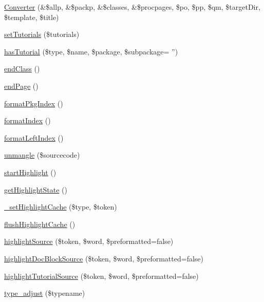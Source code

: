 \begin{DoxyCompactItemize}
\item 
\hyperlink{class_converter_a86b46c9ea23d7b44c9628a37bec7e7db}{\-Converter} (\&\$allp, \&\$packp, \&\$classes, \&\$procpages, \$po, \$pp, \$qm, \$target\-Dir, \$template, \$title)
\item 
\hyperlink{class_converter_a52727c72c50673a870a912015f2ee96f}{set\-Tutorials} (\$tutorials)
\item 
\hyperlink{class_converter_a15f1ec0bd54c234732a557e8ed2a200e}{has\-Tutorial} (\$type, \$name, \$package, \$subpackage= '')
\item 
\hyperlink{class_converter_ae4962a5674fd1be0f3795cb72f2974bf}{end\-Class} ()
\item 
\hyperlink{class_converter_a7e7c9e2e7d88f78fa6f8bf8776c443e5}{end\-Page} ()
\item 
\hyperlink{class_converter_a37200c9f589ee4eaeed637c5ce1af356}{format\-Pkg\-Index} ()
\item 
\hyperlink{class_converter_a963f73984fad30cb1776cd293eeb7db7}{format\-Index} ()
\item 
\hyperlink{class_converter_a39bb30299ec5d6ba31096e51f2bcc4b4}{format\-Left\-Index} ()
\item 
\hyperlink{class_converter_ab36840588a8c62493031b9f23c4918c5}{unmangle} (\$sourcecode)
\item 
\hyperlink{class_converter_a4857ad525ae19eef047cd7a7a5e59550}{start\-Highlight} ()
\item 
\hyperlink{class_converter_a60de94fc1b76b4194d6efa2e859aac81}{get\-Highlight\-State} ()
\item 
\hyperlink{class_converter_a07f79cef0df4253f3e109ec7cc306c59}{\-\_\-set\-Highlight\-Cache} (\$type, \$token)
\item 
\hyperlink{class_converter_a9c2e1a8cb6871fafd9ab49135e594063}{flush\-Highlight\-Cache} ()
\item 
\hyperlink{class_converter_ac9a9409bcaedc45c69c0919344f7cc05}{highlight\-Source} (\$token, \$word, \$preformatted=false)
\item 
\hyperlink{class_converter_ae15249c21c99541ebff27f78c7ed7a62}{highlight\-Doc\-Block\-Source} (\$token, \$word, \$preformatted=false)
\item 
\hyperlink{class_converter_ae0a44b2e15f9fc8fc0d357e7dd39a9a2}{highlight\-Tutorial\-Source} (\$token, \$word, \$preformatted=false)
\item 
\hyperlink{class_converter_af92d383cc0eaed9523b706b2fbf9dbb3}{type\-\_\-adjust} (\$typename)
\item 

\end{DoxyCompactItemize}
